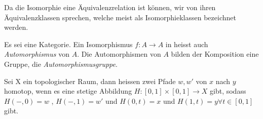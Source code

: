 \documentclass{article}
\begin{document}
		 \begin{defi}[Isomorphieklassen]
		  \cite[Definition 2.3.10]{Bra}
		 Da die Isomorphie eine \"Aquivalenzrelation ist k\"onnen, wir von ihren \"Aquivalenzklassen sprechen, welche meist als Isomorphieklassen bezeichnet werden.
		 \end{defi}
		 
		 
		\begin{defi}[Automorphismengruppen]
		\cite[Definition 2.3.13]{Bra}
		 Es sei \CatC eine Kategorie. Ein Isomorphismus \( f:A \to A \) in \CatC heisst auch \emph{Automorphismus} von $A$. Die Automorphismen von $A$ bilden \bzgl der Komposition eine Gruppe, die \emph{Automorphismusgruppe}.
		\end{defi}
		
		 \begin{defi}[Homotopieklasse]
		  \cite[Aufgabe 2.24]{Bra}
		 Sei X ein topologischer Raum, dann heissen zwei Pfade \( w,w'  \) von \(x \) nach \( y \) homotop, wenn es eine stetige Abbildung \( H : [0,1] \times [0,1 ] \to X \) gibt, sodass \( H(-,0) = w \) , \( H( -,1) =w' \) und \( H(0,t) =x \) und \(H(1,t) = y \forall t \in [0,1] \) gibt.
		 \end{defi}
		 
\end{document}
